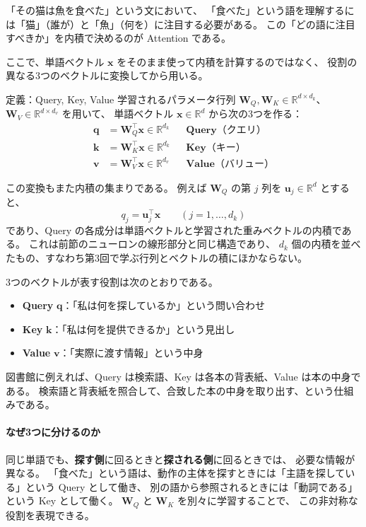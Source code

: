 「その猫は魚を食べた」という文において、
「食べた」という語を理解するには「猫」（誰が）と「魚」（何を）に注目する必要がある。
この「どの語に注目すべきか」を内積で決めるのが Attention である。

ここで、単語ベクトル $\bm{x}$ をそのまま使って内積を計算するのではなく、
役割の異なる3つのベクトルに変換してから用いる。

\begin{itembox}[l]{定義：Query, Key, Value}
学習されるパラメータ行列
$\bm{W}_Q, \bm{W}_K \in \mathbb{R}^{d \times d_k}$、
$\bm{W}_V \in \mathbb{R}^{d \times d_v}$ を用いて、
単語ベクトル $\bm{x} \in \mathbb{R}^d$ から次の3つを作る：
\begin{align}
  \bm{q} &= \bm{W}_Q^\top \bm{x} \in \mathbb{R}^{d_k} &&\textbf{Query}（クエリ） \\
  \bm{k} &= \bm{W}_K^\top \bm{x} \in \mathbb{R}^{d_k} &&\textbf{Key}（キー） \\
  \bm{v} &= \bm{W}_V^\top \bm{x} \in \mathbb{R}^{d_v} &&\textbf{Value}（バリュー）
\end{align}
\end{itembox}

この変換もまた内積の集まりである。
例えば $\bm{W}_Q$ の第 $j$ 列を $\bm{u}_j \in \mathbb{R}^d$ とすると、
\begin{equation}
  q_j = \bm{u}_j^\top \bm{x} \qquad (j = 1, \ldots, d_k)
\end{equation}
であり、Query の各成分は単語ベクトルと学習された重みベクトルの内積である。
これは前節のニューロンの線形部分と同じ構造であり、
$d_k$ 個の内積を並べたもの、すなわち第3回で学ぶ行列とベクトルの積にほかならない。

3つのベクトルが表す役割は次のとおりである。
\begin{itemize}
  \item \textbf{Query} $\bm{q}$：「私は何を探しているか」という問い合わせ
  \item \textbf{Key} $\bm{k}$：「私は何を提供できるか」という見出し
  \item \textbf{Value} $\bm{v}$：「実際に渡す情報」という中身
\end{itemize}
図書館に例えれば、Query は検索語、Key は各本の背表紙、Value は本の中身である。
検索語と背表紙を照合して、合致した本の中身を取り出す、という仕組みである。

\paragraph{なぜ3つに分けるのか}
同じ単語でも、\textbf{探す側}に回るときと\textbf{探される側}に回るときでは、
必要な情報が異なる。
「食べた」という語は、動作の主体を探すときには「主語を探している」という Query として働き、
別の語から参照されるときには「動詞である」という Key として働く。
$\bm{W}_Q$ と $\bm{W}_K$ を別々に学習することで、
この非対称な役割を表現できる。

